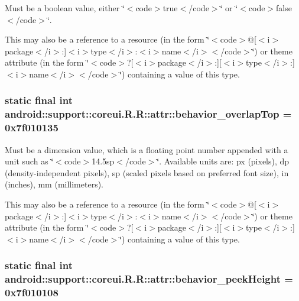 Must be a boolean value, either \char`\"{}$<$code$>$true$<$/code$>$\char`\"{} or \char`\"{}$<$code$>$false$<$/code$>$\char`\"{}. 

This may also be a reference to a resource (in the form \char`\"{}$<$code$>$@\mbox{[}$<$i$>$package$<$/i$>$:\mbox{]}$<$i$>$type$<$/i$>$:$<$i$>$name$<$/i$>$$<$/code$>$\char`\"{}) or theme attribute (in the form \char`\"{}$<$code$>$?\mbox{[}$<$i$>$package$<$/i$>$:\mbox{]}\mbox{[}$<$i$>$type$<$/i$>$:\mbox{]}$<$i$>$name$<$/i$>$$<$/code$>$\char`\"{}) containing a value of this type. \hypertarget{classandroid_1_1support_1_1coreui_1_1_r_1_1attr_03d77d61b8e558afb9b81e619b67ddba}{
\subsubsection[{behavior\_\-overlapTop}]{\setlength{\rightskip}{0pt plus 5cm}static final int android::support::coreui.R.R::attr::behavior\_\-overlapTop = 0x7f010135}}
\label{classandroid_1_1support_1_1coreui_1_1_r_1_1attr_03d77d61b8e558afb9b81e619b67ddba}


Must be a dimension value, which is a floating point number appended with a unit such as \char`\"{}$<$code$>$14.5sp$<$/code$>$\char`\"{}. Available units are: px (pixels), dp (density-independent pixels), sp (scaled pixels based on preferred font size), in (inches), mm (millimeters). 

This may also be a reference to a resource (in the form \char`\"{}$<$code$>$@\mbox{[}$<$i$>$package$<$/i$>$:\mbox{]}$<$i$>$type$<$/i$>$:$<$i$>$name$<$/i$>$$<$/code$>$\char`\"{}) or theme attribute (in the form \char`\"{}$<$code$>$?\mbox{[}$<$i$>$package$<$/i$>$:\mbox{]}\mbox{[}$<$i$>$type$<$/i$>$:\mbox{]}$<$i$>$name$<$/i$>$$<$/code$>$\char`\"{}) containing a value of this type. \hypertarget{classandroid_1_1support_1_1coreui_1_1_r_1_1attr_6f803b428c15dc52278eeca4b0af12e3}{
\subsubsection[{behavior\_\-peekHeight}]{\setlength{\rightskip}{0pt plus 5cm}static final int android::support::coreui.R.R::attr::behavior\_\-peekHeight = 0x7f010108}}
\label{classandroid_1_1support_1_1coreui_1_1_r_1_1attr_6f803b428c15dc52278eeca4b0af12e3}


